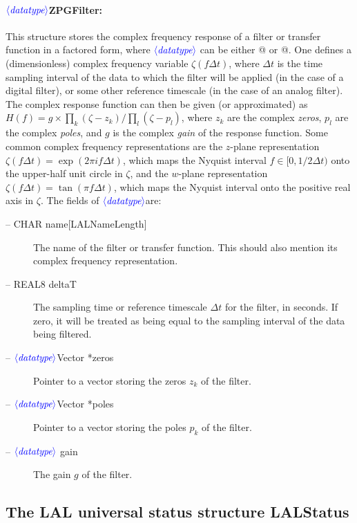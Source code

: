 \documentclass[10pt]{ligodcc}
\renewcommand{\texttt}[1]{{\ttfamily\color{blue}#1}}
\newcommand{\opt}[1]{\ensuremath{\color{blue}\langle\textit{#1}\rangle}}
\begin{document}
\paragraph{\opt{datatype}\texttt{ZPGFilter}:}
This structure stores the complex frequency response of a filter or
transfer function in a factored form, where \opt{datatype} can be
either @ or @.  One defines a
(dimensionless) complex frequency variable $\zeta(f\Delta t)$, where
$\Delta t$ is the time sampling interval of the data to which the
filter will be applied (in the case of a digital filter), or some
other reference timescale (in the case of an analog filter).  The
complex response function can then be given (or approximated) as
$H(f)=g\times\prod_k(\zeta-z_k)/\prod_l(\zeta-p_l)$, where $z_k$ are
the complex \emph{zeros}, $p_l$ are the complex \emph{poles}, and $g$
is the complex \emph{gain} of the response function.  Some common
complex frequency representations are the $z$-plane representation
$\zeta(f\Delta t)=\exp(2\pi if\Delta t)$, which maps the Nyquist
interval $f\in[0,1/2\Delta t)$ onto the upper-half unit circle in
$\zeta$, and the $w$-plane representation $\zeta(f\Delta t)=\tan(\pi
f\Delta t)$, which maps the Nyquist interval onto the positive real
axis in $\zeta$.  The fields of \opt{datatype}\verb@ZPGFilter@ are:
\begin{description}
\item[-- \texttt{CHAR name[LALNameLength]}] The name of the filter or transfer
function.  This should also mention its complex frequency
representation.
\item[-- \texttt{REAL8 deltaT}] The sampling time or reference timescale
$\Delta t$ for the filter, in seconds.  If zero, it will be treated as
being equal to the sampling interval of the data being filtered.
\item[-- \opt{datatype}\texttt{Vector *zeros}] Pointer to a vector storing
the zeros $z_k$ of the filter.
\item[-- \opt{datatype}\texttt{Vector *poles}] Pointer to a vector storing
the poles $p_k$ of the filter.
\item[-- \opt{datatype} \texttt{gain}] The gain $g$ of the filter.
\end{description}


\subsection{The LAL universal status structure \texttt{LALStatus}}
\label{ss:status-structure}
\end{document}
